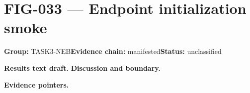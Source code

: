 \clearpage
\section{FIG-033 --- Endpoint initialization smoke}
\label{figpage:fig-033}
\textbf{Group:} TASK3-NEB\quad \textbf{Evidence chain:} manifested\quad \textbf{Status:} unclassified

\textbf{Results text draft.} 
\textbf{Discussion and boundary.} 


\textbf{Evidence pointers.}



\vfill
